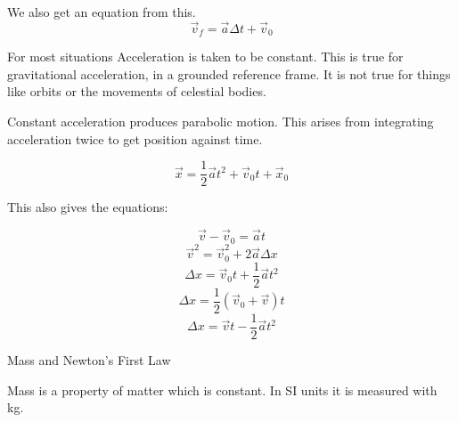 \documentclass{report}
\begin{document}
\begin{description}
\begin{mdframed}
            We also get an equation from this.
            \begin{displaymath}
                \vec{v}_f = \vec{a} \Delta t + \vec{v}_0
            \end{displaymath}

            For most situations Acceleration is taken to be
            constant. This is true for gravitational acceleration,
            in a grounded reference frame. It is not true for
            things like orbits or the movements of celestial
            bodies.

            Constant acceleration produces parabolic motion.
            This arises from integrating acceleration twice
            to get position against time.

            \begin{displaymath}
                \vec{x} = \frac{1}{2}\vec{a}t^2
                + \vec{v}_0 t + \vec{x}_0
            \end{displaymath}

            This also gives the equations:
            
            \begin{displaymath}
                \vec{v} - \vec{v}_0 = \vec{a}t
            \end{displaymath}
            \begin{displaymath}
                \vec{v}^2 = \vec{v}_0^2 + 2\vec{a}\Delta x
            \end{displaymath}
            \begin{displaymath}
                \Delta x = \vec{v}_0 t + \frac{1}{2}\vec{a}t^2
            \end{displaymath}
            \begin{displaymath}
                \Delta x = \frac{1}{2}(\vec{v}_0 + \vec{v})t
            \end{displaymath}
            \begin{displaymath}
                \Delta x = \vec{v}t - \frac{1}{2}\vec{a}t^2
            \end{displaymath}
            \begin{center}
            \end{center}
        \end{mdframed}
    \item {\large Mass and Newton's First Law}
        \begin{mdframed}
             Mass is a property of matter which is constant.
             In SI units it is measured with kg.


\end{mdframed}
\end{description}
\end{document}
